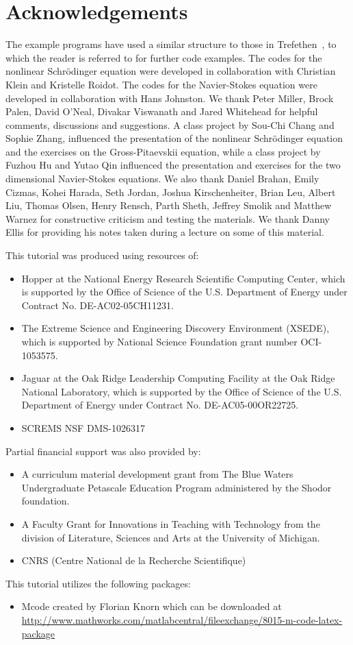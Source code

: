 \chapter*{Acknowledgements}

The example programs have used a similar structure to those in Trefethen~\cite{Tre00}, to which the reader is referred to for further code examples. The codes for the nonlinear Schr\"{o}dinger equation were developed in collaboration with Christian Klein and Kristelle Roidot. The codes for the Navier-Stokes equation were developed in collaboration with Hans Johnston. We thank Peter Miller, Brock Palen, David O'Neal,  Divakar Viswanath and Jared Whitehead for helpful comments, discussions and suggestions. A class project by Sou-Chi Chang and Sophie Zhang, influenced the presentation of the nonlinear Schr\"{o}dinger equation and the exercises on the Gross-Pitaevskii equation, while a class project by Fuzhou Hu and Yutao Qin influenced the presentation and exercises for the two dimensional Navier-Stokes equations. We also thank Daniel Brahan, Emily Cizmas, Kohei Harada, Seth Jordan, Joshua Kirschenheiter, Brian Leu, Albert Liu, Thomas Olsen, Henry Rensch, Parth Sheth, Jeffrey Smolik and Matthew Warnez for constructive criticism and testing the materials. We thank Danny Ellis for providing his notes taken during a lecture on some of this material. 

This tutorial was produced using resources of:
\begin{itemize}
\item  Hopper at the National Energy Research Scientific Computing Center, which is supported by the Office of Science of the U.S. Department of Energy under Contract No. DE-AC02-05CH11231. 
\item The Extreme Science and Engineering Discovery Environment (XSEDE), which is supported by National Science Foundation grant number OCI-1053575.
\item Jaguar at the Oak Ridge Leadership Computing Facility at the Oak Ridge National Laboratory, which is supported by the Office of Science of the U.S. Department of Energy under Contract No. DE-AC05-00OR22725.
\item SCREMS NSF DMS-1026317
\end{itemize}

Partial financial support was also provided by:
\begin{itemize}
\item A curriculum material development grant from The Blue Waters Undergraduate Petascale Education Program  administered by the Shodor foundation.
\item A Faculty Grant for Innovations in Teaching with Technology from the division of Literature, Sciences and Arts at the  University of Michigan.
\item CNRS (Centre National de la Recherche Scientifique)
\end{itemize}

This tutorial utilizes the following packages:
\begin{itemize}
\item Mcode created by Florian Knorn which can be downloaded at \url{http://www.mathworks.com/matlabcentral/fileexchange/8015-m-code-latex-package}
\end{itemize}
